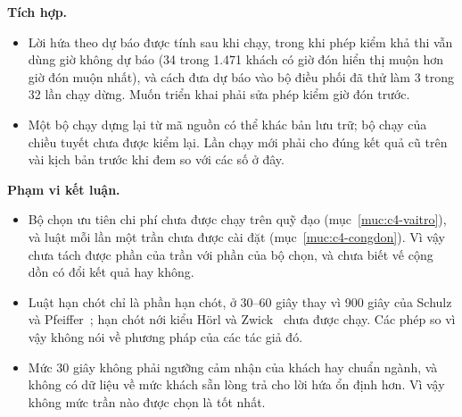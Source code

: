 \textbf{Tích hợp.}
\begin{itemize}[leftmargin=1.2cm,itemsep=2pt,topsep=3pt]
\item Lời hứa theo dự báo được tính sau khi chạy, trong khi phép kiểm khả thi vẫn dùng giờ không dự báo (34 trong
1.471 khách có giờ đón hiển thị muộn hơn giờ đón muộn nhất), và cách đưa dự báo vào bộ điều phối đã thử làm 3 trong
32 lần chạy dừng. Muốn triển khai phải sửa phép kiểm giờ đón trước.
\item Một bộ chạy dựng lại từ mã nguồn có thể khác bản lưu trữ; bộ chạy của chiều tuyết chưa được kiểm lại. Lần chạy
mới phải cho đúng kết quả cũ trên vài kịch bản trước khi đem so với các số ở đây.
\end{itemize}

\textbf{Phạm vi kết luận.}
\begin{itemize}[leftmargin=1.2cm,itemsep=2pt,topsep=3pt]
\item Bộ chọn ưu tiên chi phí chưa được chạy trên quỹ đạo (mục~\ref{muc:c4-vaitro}), và luật mỗi lần một trần chưa
được cài đặt (mục~\ref{muc:c4-congdon}). Vì vậy chưa tách được phần của trần với phần của bộ chọn, và chưa biết vế
cộng dồn có đổi kết quả hay không.
\item Luật hạn chót chỉ là phần hạn chót, ở 30--60 giây thay vì 900 giây của Schulz và Pfeiffer~\cite{schulz2026};
hạn chót nới kiểu Hörl và Zwick~\cite{horl2022} chưa được chạy. Các phép so vì vậy không nói về phương pháp của các
tác giả đó.
\item Mức 30 giây không phải ngưỡng cảm nhận của khách hay chuẩn ngành, và không có dữ liệu về mức khách sẵn lòng trả
cho lời hứa ổn định hơn. Vì vậy không mức trần nào được chọn là tốt nhất.
\end{itemize}
